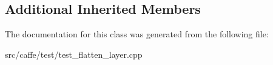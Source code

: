 \subsection*{Additional Inherited Members}


The documentation for this class was generated from the following file\+:\begin{DoxyCompactItemize}
\item 
src/caffe/test/test\+\_\+flatten\+\_\+layer.\+cpp\end{DoxyCompactItemize}
